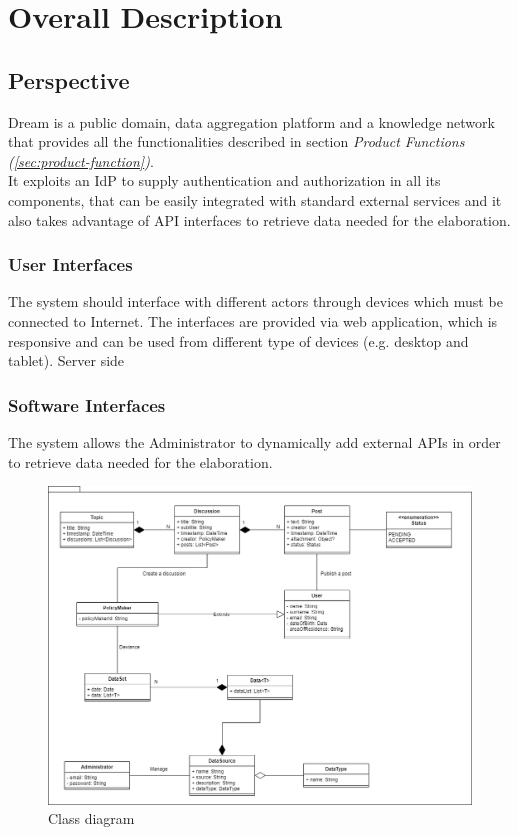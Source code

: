 \section{Overall Description}
\subsection{Perspective}
Dream is a public domain, data aggregation platform and a knowledge network that provides all the functionalities described in section \textit{Product Functions (\ref{sec:product-function})}.\\
It exploits an IdP to supply authentication and authorization in all its components, that can be easily integrated with standard external services and it also takes advantage of API interfaces to retrieve data needed for the elaboration.

\subsubsection{User Interfaces}
The system should interface with different actors through devices which must be connected to Internet. The interfaces are provided via web application, which is responsive and can be used from different type of devices (e.g. desktop and tablet). Server side 

\subsubsection{Software Interfaces}
The system allows the Administrator to dynamically add external APIs in order to retrieve data needed for the elaboration.

\begin{figure}[h!]
    \centering
    \includegraphics[scale=0.35]{images/class_diagram.png}
    \caption{Class diagram}
    \label{fig:class_diagram}
\end{figure}
\FloatBarrier

